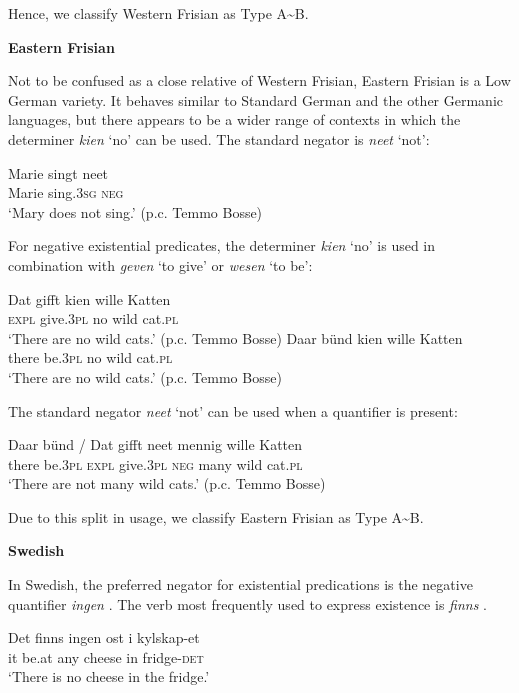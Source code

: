 ﻿\documentclass[output=paper]{langsci/langscibook}
\begin{document}
\begin{unindented}
Hence, we classify Western Frisian as Type A{\textasciitilde}B.

\textbf{Eastern Frisian}

Not to be confused as a close relative of Western Frisian, Eastern Frisian is a Low German variety. It behaves similar to Standard German and the other Germanic languages, but there appears to be a wider range of contexts in which the determiner \textit{kien} `no' can be used. The standard negator is \textit{neet} `not':
%
\begin{exe}\ex \gll Marie singt neet \\
Marie sing.\textsc{3sg} \textsc{neg} \\
    \glt `Mary does not sing.' (p.c. Temmo Bosse)
    \end{exe} 

For negative existential predicates, the determiner \textit{kien} `no' is used in combination with \textit{geven} `to give' or \textit{wesen} `to be':
%
\begin{exe}\ex \gll Dat gifft kien wille Katten \\
\textsc{expl}  give.\textsc{3pl} no wild cat.\textsc{pl} \\
    \glt `There are no wild cats.' (p.c. Temmo Bosse)
\ex \gll Daar bünd   kien wille Katten \\
there be.\textsc{3pl} no   wild  cat.\textsc{pl} \\
    \glt `There are no wild cats.' (p.c. Temmo Bosse)
    \end{exe}

The standard negator \textit{neet} `not' can be used when a quantifier is present:
%
\begin{exe}\ex \gll Daar bünd / Dat gifft neet mennig wille Katten \\
there be.\textsc{3pl} {} \textsc{expl} give.\textsc{3pl} \textsc{neg} many     wild cat\textsc{.pl} \\
    \glt `There are not many wild cats.' (p.c. Temmo Bosse)
    \end{exe}

Due to this split in usage, we classify Eastern Frisian as Type A{\textasciitilde}B. 

\textbf{Swedish}

In Swedish, the preferred negator for existential predications is the negative quantifier \textit{ingen} \citep{Bordal2017}. The verb most frequently used to express existence is \textit{finns} \citep[9]{Bordal2017}. 
%
\begin{exe}\ex \gll Det finns ingen ost i   kylskap-et \\
it be.at any cheese in fridge-\textsc{det} \\
    \glt `There is no cheese in the fridge.' \citep[115]{Veselinova2013}
    \end{exe}


\end{unindented}
\end{document}

